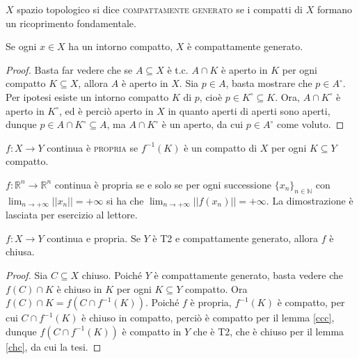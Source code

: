 \begin{defn}
  $X$ spazio topologico si dice \textsc{compattamente generato} se i compatti di $X$ formano un ricoprimento fondamentale.
\end{defn}

\begin{lm}
  Se ogni $x \in X$ ha un intorno compatto, $X$ è compattamente generato.
\end{lm}

\begin{proof}
  Basta far vedere che se $A \subseteq X$ è t.c. $A \cap K$ è aperto in $K$ per ogni compatto $K \subseteq X$, allora $A$ è aperto in $X$. Sia $p \in A$, basta mostrare che $p \in A^{\circ}$. Per ipotesi esiste un intorno compatto $K$ di $p$, cioè $p \in K^{\circ} \subseteq K$.
  Ora, $A \cap K^{\circ}$ è aperto in $K^{\circ}$, ed è perciò aperto in $X$ in quanto aperti di aperti sono aperti, dunque $p \in A \cap K^{\circ} \subseteq A$, ma $A \cap K^{\circ}$ è un aperto, da cui $p \in A^{\circ}$ come voluto.
\end{proof}

\begin{defn}
  $f:X \rightarrow Y$ continua è \textsc{propria} se $f^{-1}(K)$ è un compatto di $X$ per ogni $K \subseteq Y$ compatto.
\end{defn}

\begin{ex}
  $f:\mathbb{R}^n \rightarrow \mathbb{R}^n$ continua è propria se e solo se per ogni successione $\{x_n\}_{n \in \mathbb{N}}$ con $\displaystyle \lim_{n \rightarrow +\infty} ||x_n||=+\infty$ si ha che $\displaystyle \lim_{n \rightarrow +\infty} ||f(x_n)||=+\infty$. La dimostrazione è lasciata per esercizio al lettore.
\end{ex}

\begin{thm}
  $f:X \rightarrow Y$ continua e propria. Se $Y$ è T2 e compattamente generato, allora $f$ è chiusa.
\end{thm}

\begin{proof}
  Sia $C \subseteq X$ chiuso. Poiché $Y$ è compattamente generato, basta vedere che $f(C) \cap K$ è chiuso in $K$ per ogni $K \subseteq Y$ compatto. Ora $f(C) \cap K=f(C \cap f^{-1}(K))$. Poiché $f$ è propria, $f^{-1}(K)$ è compatto, per cui $C \cap f^{-1}(K)$ è chiuso in compatto, perciò è compatto per il lemma \ref{ccc}, dunque $f(C \cap f^{-1}(K))$ è compatto in $Y$ che è T2, che è chiuso per il lemma \ref{chc}, da cui la tesi.
\end{proof}

